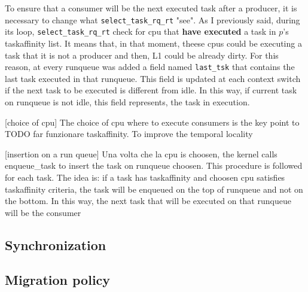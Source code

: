 To ensure that a consumer will be the next executed task after a producer, it is necessary to change what \texttt{select\_task\_rq\_rt} "see". As I 
previously said, during its loop, \texttt{select\_task\_rq\_rt} check for cpu that \textbf{have executed} a task in $p$'s taskaffinity list. It means
that, in that moment, theese cpus could be executing a task that it is not a producer and then, L1 could be already dirty. For this reason, at every 
runqueue was added a field named \texttt{last\_tsk} that contains the last task executed in that runqueue. This field is updated at each context switch 
if the next task to be executed is different from idle. In this way, if current task on runqueue is not idle, this field represents, the task in execution. 




[choice of cpu] The choice of cpu where to execute consumers is the key point to TODO far funzionare taskaffinity. To improve the temporal locality

[insertion on a run queue] Una volta che la cpu is choosen, the kernel calls enqueue\_task to insert the task on runqueue choosen. This procedure is 
followed for each task. The idea is: if a task has taskaffinity and choosen cpu satisfies taskaffinity criteria, the task will be enqueued on the top of 
runqueue and not on the bottom. In this way, the next task that will be executed on that runqueue will be the consumer



\subsection{Synchronization}




\subsection{Migration policy}



